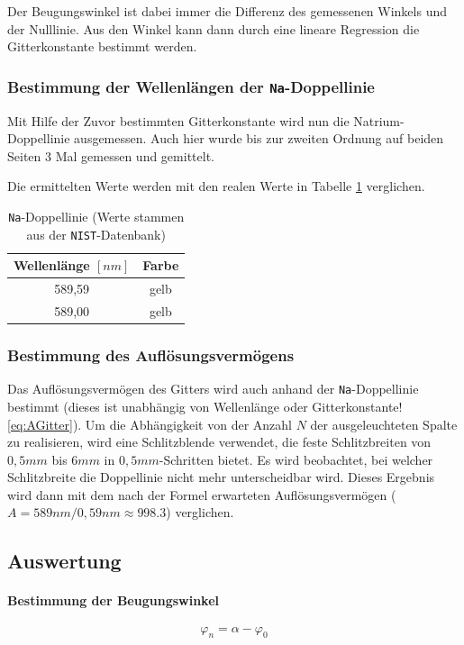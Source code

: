 \documentclass[a4paper, 11pt]{article}
\begin{document}
Der Beugungswinkel ist dabei immer die Differenz des gemessenen Winkels und der Nulllinie. Aus den Winkel kann dann durch eine lineare Regression die Gitterkonstante bestimmt werden.

\subsubsection{Bestimmung der Wellenlängen der \texttt{Na}-Doppellinie}
Mit Hilfe der Zuvor bestimmten Gitterkonstante wird nun die Natrium-Doppellinie ausgemessen. Auch hier wurde bis zur zweiten Ordnung auf beiden Seiten 3 Mal gemessen und gemittelt.


Die ermittelten Werte werden mit den realen Werte in Tabelle \ref{table:SpektrumNa} verglichen.

\begin{table}[H]
	\large
	\centering
	\begin{tabular}{|c|c|}
		\hline
		Wellenlänge $[nm]$ & Farbe \\
		\hline
		589,59 & gelb \\
		\hline
		589,00 & gelb \\
		\hline
	\end{tabular}
	\caption{\texttt{Na}-Doppellinie (Werte stammen aus der \texttt{NIST}-Datenbank)}
	\label{table:SpektrumNa}
\end{table}

\subsubsection{Bestimmung des Auflösungsvermögens}
Das Auflösungsvermögen des Gitters wird auch anhand der \texttt{Na}-Doppellinie bestimmt (dieses ist unabhängig von Wellenlänge oder Gitterkonstante! \ref{eq:AGitter}).
Um die Abhängigkeit von der Anzahl $N$ der ausgeleuchteten Spalte zu realisieren, wird eine Schlitzblende verwendet, die feste Schlitzbreiten von $0,5mm$ bis $6mm$ in $0,5mm$-Schritten bietet. Es wird beobachtet, bei welcher Schlitzbreite die Doppellinie nicht mehr unterscheidbar wird. Dieses Ergebnis wird dann mit dem nach der Formel erwarteten Auflösungsvermögen ($A=589nm/0,59nm\approx998.3$) verglichen.



\clearpage
\subsection{Auswertung}
\paragraph{Bestimmung der Beugungswinkel}
\begin{equation}
	\varphi_n = \alpha - \varphi_0
\end{equation}
\end{document}

